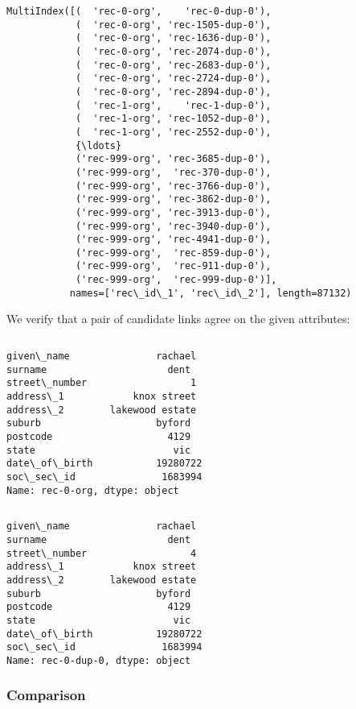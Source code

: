 \documentclass{article}
\begin{document}
    \begin{Verbatim}[commandchars=\\\{\}]

\end{Verbatim}
\begin{Verbatim}[commandchars=\\\{\}]
MultiIndex([(  'rec-0-org',    'rec-0-dup-0'),
            (  'rec-0-org', 'rec-1505-dup-0'),
            (  'rec-0-org', 'rec-1636-dup-0'),
            (  'rec-0-org', 'rec-2074-dup-0'),
            (  'rec-0-org', 'rec-2683-dup-0'),
            (  'rec-0-org', 'rec-2724-dup-0'),
            (  'rec-0-org', 'rec-2894-dup-0'),
            (  'rec-1-org',    'rec-1-dup-0'),
            (  'rec-1-org', 'rec-1052-dup-0'),
            (  'rec-1-org', 'rec-2552-dup-0'),
            {\ldots}
            ('rec-999-org', 'rec-3685-dup-0'),
            ('rec-999-org',  'rec-370-dup-0'),
            ('rec-999-org', 'rec-3766-dup-0'),
            ('rec-999-org', 'rec-3862-dup-0'),
            ('rec-999-org', 'rec-3913-dup-0'),
            ('rec-999-org', 'rec-3940-dup-0'),
            ('rec-999-org', 'rec-4941-dup-0'),
            ('rec-999-org',  'rec-859-dup-0'),
            ('rec-999-org',  'rec-911-dup-0'),
            ('rec-999-org',  'rec-999-dup-0')],
           names=['rec\_id\_1', 'rec\_id\_2'], length=87132)
\end{Verbatim}
    We verify that a pair of candidate links agree on the given attributes:

    \begin{Verbatim}[commandchars=\\\{\}]

\end{Verbatim}
\begin{Verbatim}[commandchars=\\\{\}]
given\_name               rachael
surname                     dent
street\_number                  1
address\_1            knox street
address\_2        lakewood estate
suburb                    byford
postcode                    4129
state                        vic
date\_of\_birth           19280722
soc\_sec\_id               1683994
Name: rec-0-org, dtype: object
\end{Verbatim}
    \begin{Verbatim}[commandchars=\\\{\}]

\end{Verbatim}
\begin{Verbatim}[commandchars=\\\{\}]
given\_name               rachael
surname                     dent
street\_number                  4
address\_1            knox street
address\_2        lakewood estate
suburb                    byford
postcode                    4129
state                        vic
date\_of\_birth           19280722
soc\_sec\_id               1683994
Name: rec-0-dup-0, dtype: object
\end{Verbatim}
    \hypertarget{comparison}{%
\subsubsection{Comparison}\label{comparison}}
\end{document}
